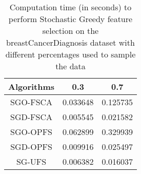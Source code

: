 \begin{table}
	\begin{center}
		\begin{tabular}{c c c}
			Algorithms & 0.3 & 0.7 \\
			\hline
			SGO-FSCA & 0.033648 & 0.125735 \\
			SGD-FSCA & 0.005545 & 0.021582 \\
			SGO-OPFS & 0.062899 & 0.329939 \\
			SGD-OPFS & 0.009916 & 0.025497 \\
			SG-UFS & 0.006382 & 0.016037 \\
		\end{tabular}
	\end{center}
	\caption{Computation time (in seconds) to perform Stochastic Greedy feature selection on the breastCancerDiagnosis dataset with different percentages used to sample the data}
\end{table}